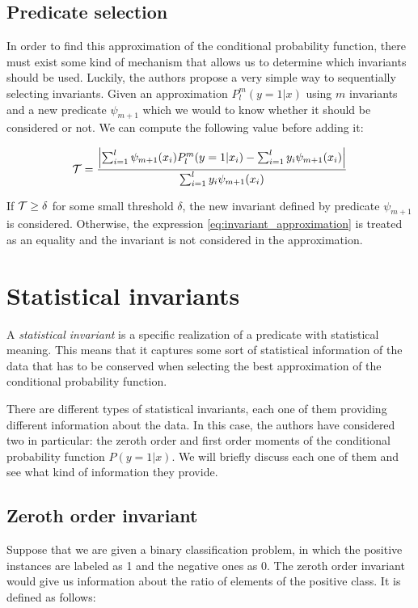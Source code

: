 \subsection{Predicate selection}

In order to find this approximation of the conditional probability function, there must exist
some kind of mechanism that allows us to determine which invariants should be used. Luckily,
the authors propose a very simple way to sequentially selecting invariants. Given an approximation
$P_l^m(y=1|x)$ using $m$ invariants and a new predicate $\psi_{m+1}$ which we would to know whether
it should be considered or not. We can compute the following value before adding it:

\begin{equation}
    \label{eq:predicate_selection}
    \mathcal{T} = \frac{\left| \sum_{i=1}^l \psi_{m+1}(x_i) P^m_l(y = 1 | x_i) - \sum_{i=1}^l y_i \psi_{m+1}(x_i) \right|}{\sum_{i=1}^l y_i \psi_{m+1}(x_i)}
\end{equation}

If $\mathcal{T} \geq \delta$ for some small threshold $\delta$, the new invariant defined by predicate $\psi_{m+1}$
is considered. Otherwise, the expression \eqref{eq:invariant_approximation} is treated as an equality
and the invariant is not considered in the approximation.


\section{Statistical invariants}

A \emph{statistical invariant} is a specific realization of a predicate with statistical meaning.
This means that it captures some sort of statistical information of the data that has to be
conserved when selecting the best approximation of the conditional probability function.

There are different types of statistical invariants, each one of them
providing different information about the data. In this case, the authors have considered
two in particular: the zeroth order and first order moments of the conditional probability
function $P(y=1|x)$. We will briefly discuss each one of them and see what kind of information
they provide.

\subsection{Zeroth order invariant}

Suppose that we are given a binary classification problem, in which the positive instances
are labeled as 1 and the negative ones as 0. The zeroth order invariant would give us information
about the ratio of elements of the positive class. It is defined as follows:

